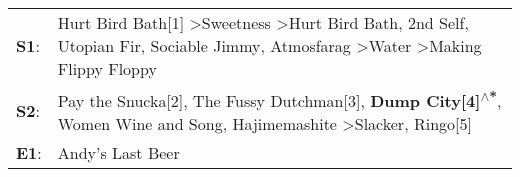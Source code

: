 \begin{supertabular}{p{0.03\textwidth}p{0.92\textwidth}}
 \textbf{S1}:  &  Hurt Bird Bath[1]\textsuperscript{} \textgreater \enspace Sweetness\textsuperscript{} \textgreater \enspace Hurt Bird Bath\textsuperscript{}, \enspace 2nd Self\textsuperscript{}, \enspace Utopian Fir\textsuperscript{}, \enspace Sociable Jimmy\textsuperscript{}, \enspace Atmosfarag\textsuperscript{} \textgreater \enspace Water\textsuperscript{} \textgreater \enspace Making Flippy Floppy\textsuperscript{}  \enspace  \\
 \textbf{S2}:  &                                                                                         Pay the Snucka[2]\textsuperscript{}, \enspace The Fussy Dutchman[3]\textsuperscript{}, \enspace \textbf{Dump City[4]\textsuperscript{$\wedge$*}}, \enspace Women Wine and Song\textsuperscript{}, \enspace Hajimemashite\textsuperscript{} \textgreater \enspace Slacker\textsuperscript{}, \enspace Ringo[5]\textsuperscript{}  \enspace  \\
 \textbf{E1}:  &                                                                                                                                                                                                                                                                                                                                                                                      Andy's Last Beer\textsuperscript{}  \enspace  \\
\end{supertabular}
